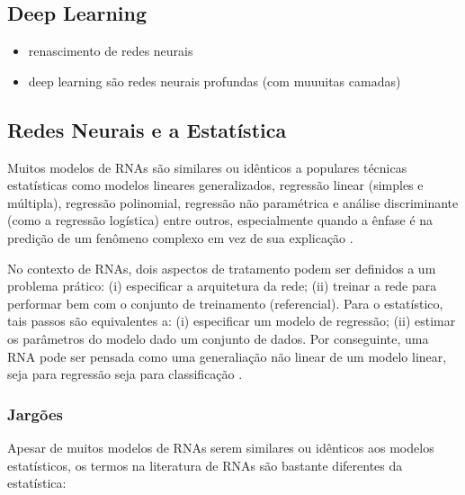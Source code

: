 \documentclass{automatextcc}
\begin{document}
\subsection{Deep Learning}

\begin{itemize}
    \item renascimento de redes neurais 
    \item deep learning são redes neurais profundas (com muuuitas camadas)
\end{itemize}


\subsection{Redes Neurais e a Estatística}
Muitos modelos de RNAs são similares ou idênticos a populares técnicas estatísticas como modelos lineares generalizados, regressão linear (simples e múltipla), regressão polinomial, regressão não paramétrica e análise discriminante (como a regressão logística) entre outros, especialmente quando a ênfase é na predição de um fenômeno complexo em vez de sua explicação \citep{sarle1994, cheng1994}.

No contexto de RNAs, dois aspectos de tratamento podem ser definidos a um problema prático: (i) especificar a arquitetura da rede; (ii) treinar a rede para performar bem com o conjunto de treinamento (referencial). Para o estatístico, tais passos são equivalentes a: (i) especificar um modelo de regressão; (ii) estimar os parâmetros do modelo dado um conjunto de dados. Por conseguinte, uma RNA pode ser pensada como uma generaliação não linear de um modelo linear, seja para regressão seja para classificação \citep{cheng1994, hastie2009}. 


\subsubsection{Jargões} 
Apesar de muitos modelos de RNAs serem similares ou idênticos aos modelos estatísticos, os termos na literatura de RNAs são bastante diferentes da estatística:
\end{document}
